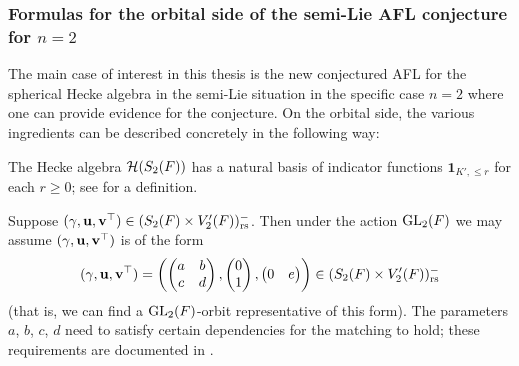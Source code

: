 \subsubsection{Formulas for the orbital side of the semi-Lie AFL conjecture for $n=2$}
\label{sec:semi_lie_intro_formulas}
The main case of interest in this thesis is the new conjectured AFL
for the spherical Hecke algebra in the semi-Lie situation in the
specific case $n = 2$ where one can provide evidence for the conjecture.
On the orbital side, the various ingredients can be described concretely
in the following way:
\begin{itemize}
  \ii The Hecke algebra $\mathcal H(S_2(F))$ has a natural basis of
  indicator functions $\mathbf{1}_{K', \le r}$ for each $r \ge 0$;
  see  for a definition.

  \ii Suppose ${(\gamma, \mathbf u, \mathbf v^\top)} \in (S_2(F) \times V'_2(F))_{\mathrm{rs}}^-$.
  Then under the action $\operatorname{GL}_2(F)$ we may assume ${(\gamma, \mathbf u, \mathbf v^\top)}$ is of the form
  \[
    {(\gamma, \mathbf u, \mathbf v^\top)} = \left( \begin{pmatrix} a & b \\ c & d \end{pmatrix},
      \begin{pmatrix} 0 \\ 1 \end{pmatrix},
      \begin{pmatrix} 0 & e \end{pmatrix} \right)
    \in (S_2(F) \times V_2'(F))_{\mathrm{rs}}^-
  \]
  (that is, we can find a $\operatorname{GL}_2(F)$-orbit representative of this form).
  The parameters $a$, $b$, $c$, $d$ need to satisfy certain dependencies
  for the matching to hold;
  these requirements are documented in .
\end{itemize}

